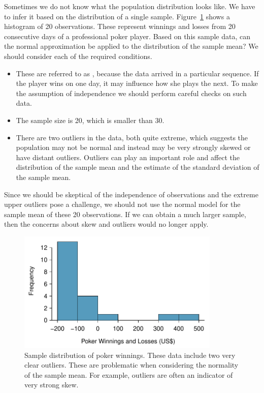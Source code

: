 \begin{examplewrap}
\begin{nexample}{Sometimes we do not know what the population distribution looks like. We have to infer it based on the distribution of a single sample. Figure~\ref{pokerProfitsCanApplyNormalToSampMean} shows a histogram of 20 observations. These represent winnings and losses from 20 consecutive days of a professional poker player. Based on this sample data, can the normal approximation be applied to the distribution of the sample mean?}
We should consider each of the required conditions.
\begin{itemize}
\setlength{\itemsep}{0mm}
\item[(1)] These are referred to as , because the data arrived in a particular sequence. If the player wins on one day, it may influence how she plays the next. To make the assumption of independence we should perform careful checks on such data.
\item[(2)] The sample size is 20, which is smaller than 30.
\item[(3)] There are two outliers in the data, both quite extreme, which suggests the population may not be normal and instead may be very strongly skewed or have distant outliers. Outliers can play an important role and affect the distribution of the sample mean and the estimate of the standard deviation of the sample mean.
\end{itemize}
Since we should be skeptical of the independence of observations and the extreme upper outliers pose a challenge, we should not use the normal model for the sample mean of these 20 observations. If we can obtain a much larger sample, then the concerns about skew and outliers would no longer apply.
\end{nexample}
\end{examplewrap}

\begin{figure}[ht]
   \centering
   \includegraphics[height=58mm]{ch_distributions/figures/pokerProfitsCanApplyNormalToSampMean/pokerProfitsCanApplyNormalToSampMean}
   \caption{Sample distribution of poker winnings. These data include two very clear outliers. These are problematic when considering the normality of the sample mean. For example, outliers are often an indicator of very strong skew.}
   \label{pokerProfitsCanApplyNormalToSampMean}
\end{figure}

